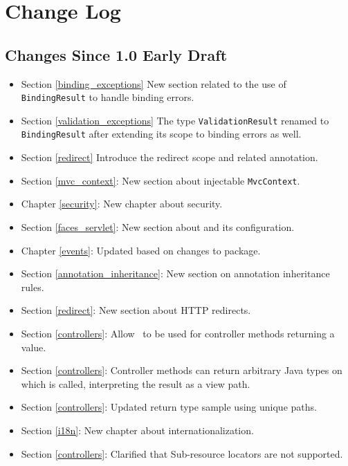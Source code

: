 \chapter{Change Log}

\section{Changes Since 1.0 Early Draft}

\begin{itemize}
\item Section \ref{binding_exceptions} New section related to the use of {\tt BindingResult}
to handle binding errors.
\item Section \ref{validation_exceptions} The type {\tt ValidationResult} renamed to 
{\tt BindingResult} after extending its scope to binding errors as well. 
\item Section \ref{redirect} Introduce the redirect scope and related annotation.
\item Section \ref{mvc_context}: New section about injectable {\tt MvcContext}.
\item Chapter \ref{security}: New chapter about security.
\item Section \ref{faces_servlet}: New section about  and its configuration.
\item Chapter \ref{events}: Updated based on changes to  package.
\item Section \ref{annotation_inheritance}: New section on annotation inheritance rules.
\item Section \ref{redirect}: New section about HTTP redirects.
\item Section \ref{controllers}: Allow \View\ to be used for controller methods returning a 
 value. 
\item Section \ref{controllers}: Controller methods can return arbitrary Java types on which 
 is called, interpreting the result as a view path.
\item Section \ref{controllers}: Updated return type sample using unique paths.
\item Section \ref{i18n}: New chapter about internationalization.
\item Section \ref{controllers}: Clarified that Sub-resource locators are not supported.
\end{itemize}
